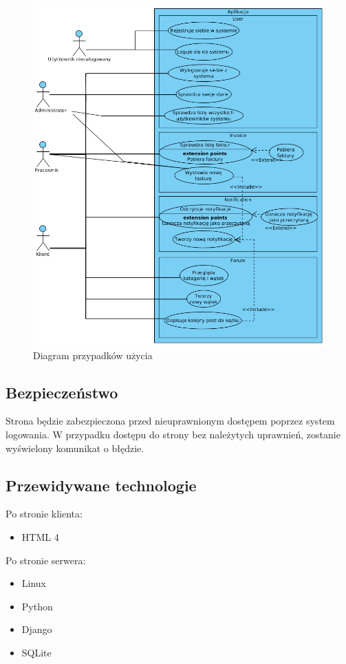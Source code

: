 \documentclass[12pt]{article}
\begin{document}
\begin{figure}[H]
	\centering
	\includegraphics[scale=0.6]{img/use_cases.png}
	\caption{Diagram przypadków użycia}
	\label{}
\end{figure}
\newpage

\subsection{Bezpieczeństwo}
Strona będzie zabezpieczona przed nieuprawnionym dostępem poprzez system logowania. W przypadku dostępu do strony bez należytych uprawnień, zostanie wyświelony komunikat o błędzie.

\subsection{Przewidywane technologie}
Po stronie klienta:
\begin{itemize}
	\item HTML 4 
\end{itemize}
Po stronie serwera:
\begin{itemize}
	\item Linux
	\item Python
	\item Django
	\item SQLite                     
\end{itemize}
\end{document}

